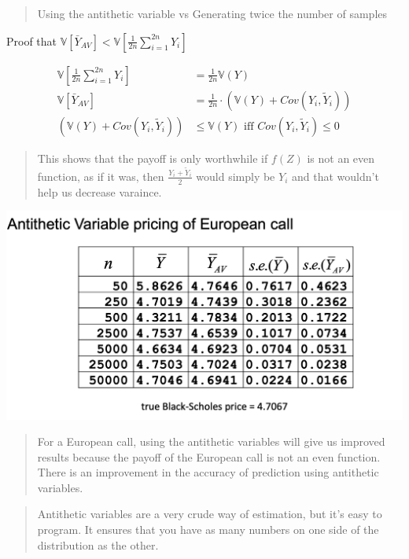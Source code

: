 \documentclass[
  oneside]{book}
\begin{document}
\begin{quote}
Using the antithetic variable vs Generating twice the number of samples
\end{quote}

Proof that \(\mathbb{V}[\bar{Y}_{AV}] < \mathbb{V}\left[ \frac{1}{2n} \sum^{2n}_{i=1}Y_{i} \right]\)

\[
\begin{aligned}
\mathbb{V}\left[ \frac{1}{2n} \sum^{2n}_{i=1}Y_{i} \right] &= \frac{1}{2n} \mathbb{V}(Y)\\
\mathbb{V}[\bar{Y}_{AV}] &= \frac{1}{2n}\cdot \left( \mathbb{V}(Y) + Cov(Y_{i}, \tilde{Y}_{i}) \right) \\
\left( \mathbb{V}(Y) + Cov(Y_{i}, \tilde{Y}_{i}) \right) &\leq \mathbb{V}(Y) \text{ iff } Cov(Y_{i}, \tilde{Y}_{i}) \leq 0
\end{aligned}
\]

\begin{quote}
This shows that the payoff is only worthwhile if \(f(Z)\) is not an even function, as if it was, then \(\frac{Y_{i}+\tilde{Y}_{i}}{2}\) would simply be \(Y_{i}\) and that wouldn't help us decrease varaince.
\end{quote}

\includegraphics{Notes/Obsidian-Attachments/12-Simulation-Variance-Reduction.png}

\begin{quote}
For a European call, using the antithetic variables will give us improved results because the payoff of the European call is not an even function.
There is an improvement in the accuracy of prediction using antithetic variables.
\end{quote}

\begin{quote}
Antithetic variables are a very crude way of estimation, but it's easy to program. It ensures that you have as many numbers on one side of the distribution as the other.
\end{quote}
\end{document}

